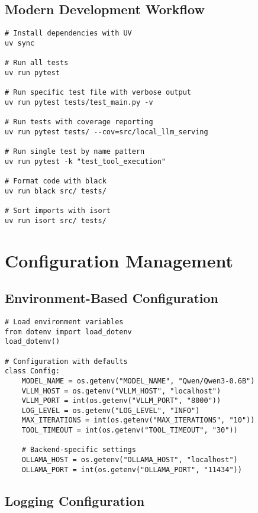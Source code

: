 \documentclass{article}
\begin{document}
\subsection{Modern Development Workflow}

\begin{lstlisting}[caption=Development Commands]
# Install dependencies with UV
uv sync

# Run all tests
uv run pytest

# Run specific test file with verbose output
uv run pytest tests/test_main.py -v

# Run tests with coverage reporting
uv run pytest tests/ --cov=src/local_llm_serving

# Run single test by name pattern
uv run pytest -k "test_tool_execution"

# Format code with black
uv run black src/ tests/

# Sort imports with isort
uv run isort src/ tests/
\end{lstlisting}

\section{Configuration Management}

\subsection{Environment-Based Configuration}

\begin{lstlisting}[caption=Configuration Management]
# Load environment variables
from dotenv import load_dotenv
load_dotenv()

# Configuration with defaults
class Config:
    MODEL_NAME = os.getenv("MODEL_NAME", "Qwen/Qwen3-0.6B")
    VLLM_HOST = os.getenv("VLLM_HOST", "localhost")
    VLLM_PORT = int(os.getenv("VLLM_PORT", "8000"))
    LOG_LEVEL = os.getenv("LOG_LEVEL", "INFO")
    MAX_ITERATIONS = int(os.getenv("MAX_ITERATIONS", "10"))
    TOOL_TIMEOUT = int(os.getenv("TOOL_TIMEOUT", "30"))

    # Backend-specific settings
    OLLAMA_HOST = os.getenv("OLLAMA_HOST", "localhost")
    OLLAMA_PORT = int(os.getenv("OLLAMA_PORT", "11434"))
\end{lstlisting}

\subsection{Logging Configuration}
\end{document}
